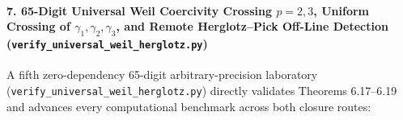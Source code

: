 \documentclass[
  11pt,
]{article}
\begin{document}
\paragraph{\texorpdfstring{7. 65-Digit Universal Weil Coercivity
Crossing \(p = 2, 3\), Uniform Crossing of
\(\gamma_1, \gamma_2, \gamma_3\), and Remote Herglotz--Pick Off-Line
Detection
(\texttt{verify\_universal\_weil\_herglotz.py})}{7. 65-Digit Universal Weil Coercivity Crossing p = 2, 3, Uniform Crossing of \textbackslash gamma\_1, \textbackslash gamma\_2, \textbackslash gamma\_3, and Remote Herglotz--Pick Off-Line Detection (verify\_universal\_weil\_herglotz.py)}}\label{digit-universal-weil-coercivity-crossing-p-2-3-uniform-crossing-of-gamma_1-gamma_2-gamma_3-and-remote-herglotzpick-off-line-detection-verify_universal_weil_herglotz.py}

A fifth zero-dependency 65-digit arbitrary-precision laboratory
(\texttt{verify\_universal\_weil\_herglotz.py}) directly validates
Theorems 6.17--6.19 and advances every computational benchmark across
both closure routes:
\end{document}
